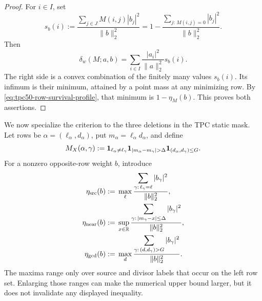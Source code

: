 \begin{proof}
For \(i\in I\), set
\begin{equation}
 s_b(i)
 :=
 \frac{\sum_{j\in J}M(i,j)|b_j|^2}{\|b\|_2^2}
 =1-
 \frac{\sum_{j:\,M(i,j)=0}|b_j|^2}{\|b\|_2^2}.
 \label{eq:tpc50-row-survival-profile}
\end{equation}
Then
\begin{equation}
 \delta_w(M;a,b)
 =\sum_{i\in I}\frac{|a_i|^2}{\|a\|_2^2}s_b(i).
 \label{eq:tpc50-survival-convex-combination}
\end{equation}
The right side is a convex combination of the finitely many values
\(s_b(i)\).  Its infimum is their minimum, attained by a point mass at
any minimizing row.  By \eqref{eq:tpc50-row-survival-profile}, that
minimum is \(1-\eta_M(b)\).  This proves both assertions.
\end{proof}

We now specialize the criterion to the three deletions in the TPC
static mask.  Let rows be \(\alpha=(\ell_\alpha,d_\alpha)\), put
\(m_\alpha=\ell_\alpha d_\alpha\), and define
\begin{equation}
 M_X(\alpha,\gamma)
 :=
 \one_{\ell_\alpha\ne\ell_\gamma}
 \one_{|m_\alpha-m_\gamma|>\Delta}
 \one_{(d_\alpha,d_\gamma)\le G}.
 \label{eq:tpc50-three-channel-mask}
\end{equation}
For a nonzero opposite-row weight \(b\), introduce
\begin{align}
 \eta_{\rm src}(b)
 &:={}
 \max_{\ell}
 \frac{\displaystyle
       \sum_{\gamma:\,\ell_\gamma=\ell}|b_\gamma|^2}
      {\|b\|_2^2},
 \label{eq:tpc50-source-concentration}\\
 \eta_{\rm near}(b)
 &:={}
 \sup_{x\in\mathbb R}
 \frac{\displaystyle
       \sum_{\gamma:\,|m_\gamma-x|\le\Delta}|b_\gamma|^2}
      {\|b\|_2^2},
 \label{eq:tpc50-near-concentration}\\
 \eta_{\rm gcd}(b)
 &:={}
 \max_{d}
 \frac{\displaystyle
       \sum_{\gamma:\,(d,d_\gamma)>G}|b_\gamma|^2}
      {\|b\|_2^2}.
 \label{eq:tpc50-gcd-concentration}
\end{align}
The maxima range only over source and divisor labels that occur on the
left row set.  Enlarging those ranges can make the numerical upper
bound larger, but it does not invalidate any displayed inequality.


